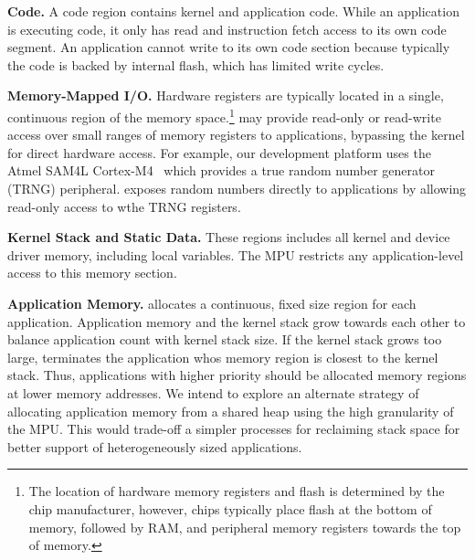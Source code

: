 {\bf Code.}
A code region contains kernel and application code. While an application is
executing code, it only has read and instruction fetch access to its own code
segment. An application cannot write to its own code section because typically
the code is backed by internal flash, which has limited write cycles.

{\bf Memory-Mapped I/O.}
Hardware registers are typically located in a single, continuous region of the
memory space.\footnote{The location of hardware memory registers and flash is
determined by the chip manufacturer, however, chips typically place flash at
the bottom of memory, followed by RAM, and peripheral memory registers towards
the top of memory.} \name may provide read-only or read-write access over small
ranges of memory registers to applications, bypassing the kernel for direct
hardware access. For example, our development platform uses the Atmel SAM4L
Cortex-M4~\cite{sam4l} which provides a true random number generator (TRNG)
peripheral. \name exposes random numbers directly to applications by allowing
read-only access to wthe TRNG registers.

{\bf Kernel Stack and Static Data.}
These regions includes all kernel and device driver memory, including local
variables. The MPU restricts any application-level access to this memory
section.

{\bf Application Memory.}
\name allocates a continuous, fixed size region for each application.
Application memory and the kernel stack grow towards each other to balance
application count with kernel stack size. If the kernel stack grows too large,
\name terminates the application whos memory region is closest to the kernel
stack. Thus, applications with higher priority should be allocated memory
regions at lower memory addresses. We intend to explore an alternate strategy of
allocating application memory from a shared heap using the high granularity of
the MPU.  This would trade-off a simpler processes for reclaiming stack space
for better support of heterogeneously sized applications.


